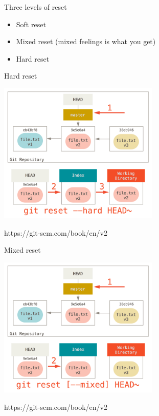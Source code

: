 \documentclass[presentation,aspectratio=169,smaller]{beamer}
\begin{document}
\begin{frame}[label={sec:org6ea2562}]{Three levels of reset}
\begin{itemize}
\item Soft reset
\item Mixed reset (mixed feelings is what you get)
\item Hard reset
\end{itemize}
\end{frame}

\begin{frame}[label={sec:orgb236308}]{Hard reset}
\begin{center}
\includegraphics[height=6.7cm]{images/reset-hard.png}
\end{center}

\scriptsize{https://git-scm.com/book/en/v2}
\end{frame}

\begin{frame}[label={sec:org1397e9c}]{Mixed reset}
\begin{center}
\includegraphics[height=6.7cm]{images/reset-mixed.png}
\end{center}

\scriptsize{https://git-scm.com/book/en/v2}
\end{frame}
\end{document}
